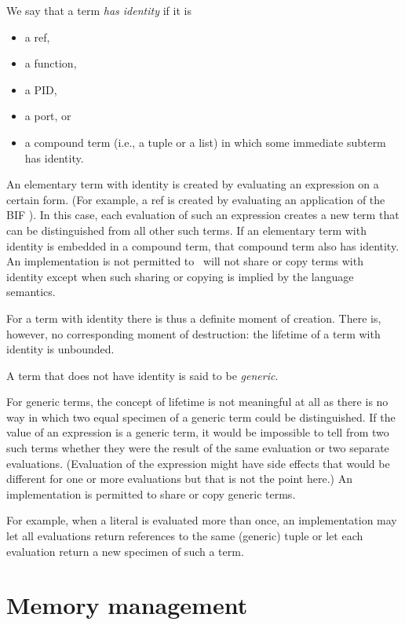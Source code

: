 We say that a term \emph{has identity} if it is
\begin{itemize}
\item a ref,
\ifStd\item a function,\fi
\item a PID,
\item a port, or 
\item a compound term (i.e., a tuple or a list) in which
some immediate subterm has identity.
\end{itemize}
An elementary term with identity is created by evaluating an
expression on a certain form. (For example, a ref is created by
evaluating an application of the BIF ).  In this case,
each evaluation of such an expression creates a new term that can be
distinguished from all other such terms.  If an elementary term with
identity is embedded in a compound term, that compound term also has
identity.
\ifStd An implementation is not permitted to \fi
\ifOld \OldErlang\ will not \fi
share or copy terms
with identity except when such sharing or copying is implied by the
language semantics.

For a term with identity there is thus a definite moment of creation.
There is, however, no corresponding moment of destruction: the
lifetime of a term with identity is unbounded.

A term that does not have identity is said to be \emph{generic}.

For generic terms, the concept of lifetime is not meaningful at all
as there is no way in which two equal specimen of a generic term could
be distinguished.  If the value of an expression is a generic term, it
would be impossible to tell from two such terms whether they were the
result of the same evaluation or two separate evaluations.
(Evaluation of the expression might have side effects that would be
different for one or more evaluations but that is not the point here.)
An implementation is permitted to share or copy generic terms.

For example, when a literal  is evaluated more than once,
an implementation may let all evaluations return references to the
same (generic) tuple or let each evaluation return a new specimen of
such a term.

\section{Memory management}

